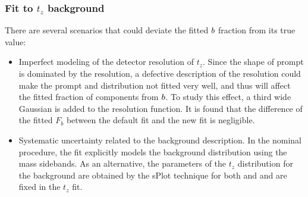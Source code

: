 \subsubsection{Fit to $t_z$ background}
\label{sec:tzsyst}
There are several scenarios that could deviate the fitted ${b}$ fraction from its true value:  
\begin{itemize}

\item Imperfect modeling of the detector resolution of $t_z$. 
Since the shape of prompt \psitwos is dominated by the resolution, a defective description of the resolution could make the prompt 
\jpsi and \psitwos distribution not fitted very well, and thus will affect the fitted fraction of components from ${b}$. 
To study this effect, a third wide Gaussian is added to the resolution function.
It is found that the difference of the fitted $F_b$ between the default fit and the new fit is negligible.

\item Systematic uncertainty related to the background description. 
In the nominal procedure, the fit explicitly models the background distribution using the mass sidebands. 
As an alternative, the parameters of the $t_z$ distribution for the background are obtained by the sPlot technique for both \jpsi and \psitwos and are fixed in the $t_z$ fit.
\end{itemize}

